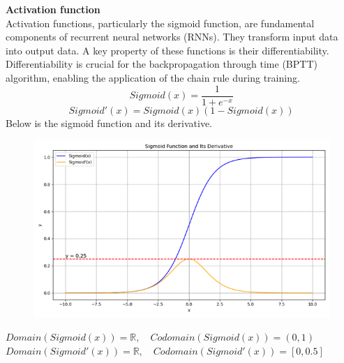 \documentclass[12pt,a4paper]{article}
\begin{document}
\newpage
\textbf{Activation function}
\\[1ex]
Activation functions, particularly the sigmoid function, are fundamental components of recurrent neural networks (RNNs). They transform input data into output data. A key property of these functions is their differentiability. Differentiability is crucial for the backpropagation through time (BPTT) algorithm, enabling the application of the chain rule during training. 
\begin{equation}
    Sigmoid(x) = \frac{ 1 }{ 1+e^{-x} }
\end{equation}
\begin{equation}
    Sigmoid'(x) = Sigmoid(x)(1-Sigmoid(x))
\end{equation}
Below is the sigmoid function and its derivative.
\begin{figure}[!htb]
    \centering
    \includegraphics[width=1\textwidth]{../Pic/sigmoid.png} %
    \label{fig:sigmoid}
\end{figure}
\newline
$Domain(Sigmoid(x))=\mathbb{R},\hspace{1em} Codomain(Sigmoid(x))=(0,1)$\\
$Domain(Sigmoid'(x))=\mathbb{R},\hspace{1em} Codomain(Sigmoid'(x))=[0,0.5]$
\end{document}
